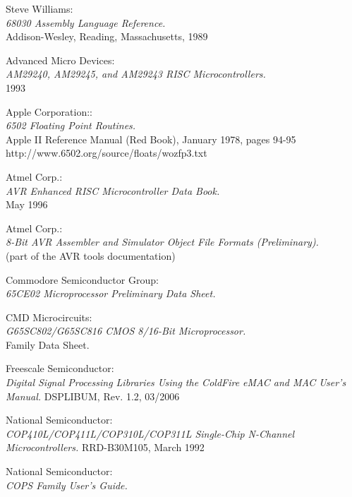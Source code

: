  Steve Williams: \\
                   {\em 68030 Assembly Language Reference.\/} \\
		   Addison-Wesley, Reading, Massachusetts, 1989

 Advanced Micro Devices: \\
		 {\em AM29240, AM29245, and AM29243 RISC
                  Microcontrollers.\/} \\
		 1993

 Apple Corporation:: \\
                 {\em 6502 Floating Point Routines.\/} \\
                 Apple II Reference Manual (Red Book), January 1978, pages 94-95 \\
                 http://www.6502.org/source/floats/wozfp3.txt

 Atmel Corp.: \\
                {\em AVR Enhanced RISC Microcontroller Data Book.\/} \\ 
                May 1996

 Atmel Corp.: \\
                 {\em 8-Bit AVR Assembler and Simulator Object File
                  Formats (Preliminary).\/} \\
                 (part of the AVR tools documentation)

 Commodore Semiconductor Group: \\
                    {\em 65CE02 Microprocessor Preliminary Data Sheet.}

 CMD Microcircuits: \\
                {\em G65SC802/G65SC816 CMOS 8/16-Bit Microprocessor.\/} \\
		Family Data Sheet.

 Freescale Semiconductor: \\
               {\em Digital Signal Processing Libraries Using the ColdFire
                eMAC and MAC User's Manual.\/}
               DSPLIBUM, Rev. 1.2, 03/2006

 National Semiconductor: \\
               {\em COP410L/COP411L/COP310L/COP311L
               Single-Chip N-Channel Microcontrollers.\/}
               RRD-B30M105, March 1992

 National Semiconductor: \\
               {\em COPS Family User's Guide.\/}                               

